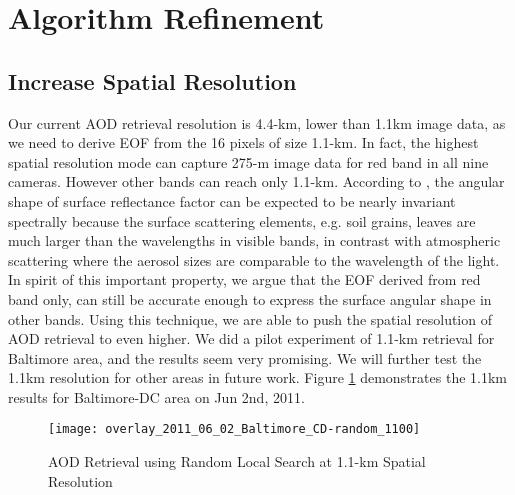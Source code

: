 \section{Algorithm Refinement}

\subsection{Increase Spatial Resolution}

Our current AOD retrieval resolution is 4.4-km, lower than 1.1km image data, as we need to derive EOF from the 16 pixels of size 1.1-km. In fact, the highest spatial resolution mode can capture 275-m image data for red band in all nine cameras. However other bands can reach only 1.1-km. According to \cite{flowerdew}, the angular shape of surface reflectance factor can be expected to be nearly invariant spectrally because the surface scattering elements, e.g. soil grains, leaves are much larger than the wavelengths in visible bands, in contrast with atmospheric scattering where the aerosol sizes are comparable to the wavelength of the light. In spirit of this important property, we argue that the EOF derived from red band only, can still be accurate enough to express the surface angular shape in other bands. Using this technique, we are able to push the spatial resolution of AOD retrieval to even higher. We did a pilot experiment of 1.1-km retrieval for Baltimore area, and the results seem very promising. We will further test the 1.1km resolution for other areas in future work. Figure \ref{fig:high_res} demonstrates the 1.1km results for Baltimore-DC area on Jun 2nd, 2011.

\begin{figure}[h!]
    \centering
    \texttt{[image: overlay\_2011\_06\_02\_Baltimore\_CD-random\_1100]}
    \caption{AOD Retrieval using Random Local Search at 1.1-km Spatial Resolution}
    \label{fig:high_res}
\end{figure}

